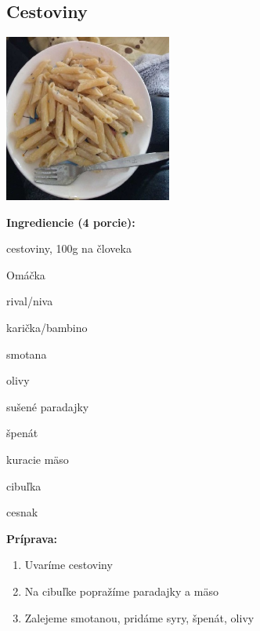 \setcounter{step}{0}

\subsection{ Cestoviny }

\begin{ingredient}
  
      \includegraphics[height=5.5cm]{images/cestoviny}
  
  \def\portions{  }
  \textbf{ {\normalsize Ingrediencie (4 porcie):} }

  \begin{main}
      \item cestoviny, 100g na človeka
  \end{main}
  
    \begin{subingredient}{Omáčka}
        \item rival/niva
        \item karička/bambino
        \item smotana
        \item olivy
        \item sušené paradajky
        \item špenát
        \item kuracie mäso
        \item cibuľka
        \item cesnak
    \end{subingredient}
  
\end{ingredient}
\begin{recipe}
\textbf{ {\normalsize Príprava:} }
\begin{enumerate}

  \item{Uvaríme cestoviny}
  \item{Na cibuľke popražíme paradajky a mäso}
  \item{Zalejeme smotanou, pridáme syry, špenát, olivy}

\end{enumerate}
\end{recipe}

\begin{notes}
  
\end{notes}	
\clearpage
